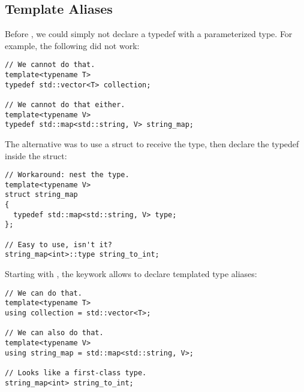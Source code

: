 \subsection{Template Aliases}

Before , we could simply not declare a typedef with a
parameterized type. For example, the following did not work:

\begin{lstlisting}
// We cannot do that.
template<typename T>
typedef std::vector<T> collection;

// We cannot do that either.
template<typename V>
typedef std::map<std::string, V> string_map;
\end{lstlisting}

The alternative was to use a struct to receive the type, then declare
the typedef inside the struct:

\begin{lstlisting}
// Workaround: nest the type.
template<typename V>
struct string_map
{
  typedef std::map<std::string, V> type;
};

// Easy to use, isn't it?
string_map<int>::type string_to_int;
\end{lstlisting}

Starting with , the  keywork allows to declare
templated type aliases:

\begin{lstlisting}
// We can do that.
template<typename T>
using collection = std::vector<T>;

// We can also do that.
template<typename V>
using string_map = std::map<std::string, V>;

// Looks like a first-class type.
string_map<int> string_to_int;
\end{lstlisting}
